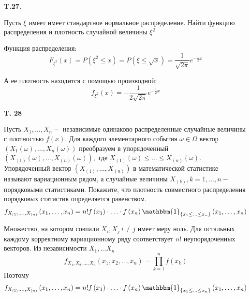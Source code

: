 \documentclass[a4paper,12pt]{article} %
\begin{document}
\begin{example}\textbf{T.27. }


Пусть $\xi$ имеет имеет стандартное нормальное распределение. 
Найти функцию распределения и плотность случайной величины $\xi^{2}$


Функция распределения:
\[ F_{\xi^2}(x)=P(\xi^2\le x)=
P(\xi\le \sqrt{x})=
\frac{1}{\sqrt{2\pi}} e^{-\frac{1}{2} x} \]

А ее плотность находится с помощью производной:
\[ f_{\xi^2}(x)=-\frac{1}{2\sqrt{2\pi}} e^{-\frac{1}{2} x} \]


\end{example}



\begin{example} \textbf{T. 28 }


Пусть $X_{1}, \ldots, X_{n}-$ независимые одинаково распределенные случайные величины с плотностью $f(x) .$ 
Для каждого элементарного события $\omega \in \Omega$ вектор $\left(X_{1}(\omega), \ldots, X_{n}(\omega)\right)$ преобразуем в 
упорядоченный $\left(X_{(1)}(\omega), \ldots, X_{(n)}(\omega)\right),$ 
где $X_{(1)}(\omega) \leq \ldots \leq X_{(n)}(\omega) .$ 
Упорядоченный вектор $\left(X_{(1)}, \ldots, X_{(n)}\right)$ в математической статистике называют вариационным рядом, а случайные величины $X_{(k)}, k=1, \ldots, n-$ порядковыми статистиками. 
Покажите, что плотность совместного распределения порядковых статистик определяется равенством.
$$
f_{X_{(1)}, \ldots, X_{(n)}}\left(x_{1}, \ldots, x_{n}\right)=
n ! f\left(x_{1}\right) \cdot \ldots \cdot f\left(x_{n}\right) \mathbbm{1}_{\left\{x_{1} \leq \ldots \leq x_{n}\right\}}\left(x_{1}, \ldots, x_{n}\right)
$$

Множество, на котором совпали $ X_i, X_j \ i\ne j$ имеет меру ноль.
Для остальных каждому корректному вариационному ряду соответствует $n!$ неупорядоченных векторов.
%
Из независимости $X_1, \ldots X_n$
\[ f_{X_1, X_2, \ldots, X_n}(x_1,x_2,...,x_n)= \prod_{k=1}^n f(x_k) \]
%
Поэтому
$$
f_{X_{(1)}, \ldots, X_{(n)}}\left(x_{1}, \ldots, x_{n}\right)=
n ! f\left(x_{1}\right) \cdot \ldots \cdot f\left(x_{n}\right) \mathbbm{1}_{\left\{x_{1} \leq \ldots \leq x_{n}\right\}}\left(x_{1}, \ldots, x_{n}\right)
$$





\end{example}
\end{document}
